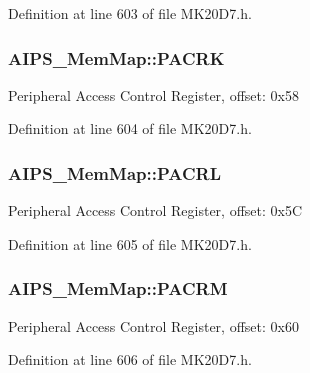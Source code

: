 Definition at line 603 of file M\+K20\+D7.\+h.

\subsubsection[{\texorpdfstring{P\+A\+C\+RK}{PACRK}}]{ A\+I\+P\+S\+\_\+\+Mem\+Map\+::\+P\+A\+C\+RK}\hypertarget{struct_a_i_p_s___mem_map_a62015f5d8f85dd001390b0168aa7389f}{}\label{struct_a_i_p_s___mem_map_a62015f5d8f85dd001390b0168aa7389f}
Peripheral Access Control Register, offset\+: 0x58 

Definition at line 604 of file M\+K20\+D7.\+h.

\subsubsection[{\texorpdfstring{P\+A\+C\+RL}{PACRL}}]{ A\+I\+P\+S\+\_\+\+Mem\+Map\+::\+P\+A\+C\+RL}\hypertarget{struct_a_i_p_s___mem_map_a564d95efed1747932b25675342cac085}{}\label{struct_a_i_p_s___mem_map_a564d95efed1747932b25675342cac085}
Peripheral Access Control Register, offset\+: 0x5C 

Definition at line 605 of file M\+K20\+D7.\+h.

\subsubsection[{\texorpdfstring{P\+A\+C\+RM}{PACRM}}]{ A\+I\+P\+S\+\_\+\+Mem\+Map\+::\+P\+A\+C\+RM}\hypertarget{struct_a_i_p_s___mem_map_a30e7ebe0ffb0e9d97cbfa85d65e17cbb}{}\label{struct_a_i_p_s___mem_map_a30e7ebe0ffb0e9d97cbfa85d65e17cbb}
Peripheral Access Control Register, offset\+: 0x60 

Definition at line 606 of file M\+K20\+D7.\+h.

